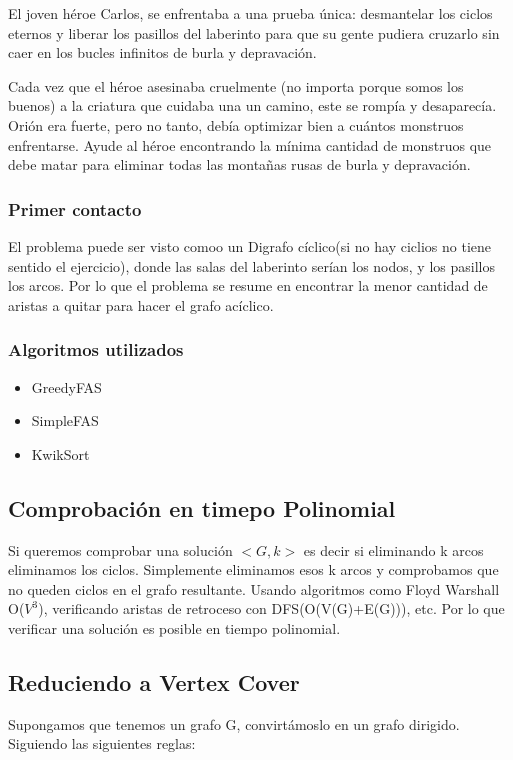 \documentclass{article}
\begin{document}
El joven héroe Carlos, se enfrentaba a una prueba única: desmantelar los ciclos eternos y liberar los pasillos del laberinto para que su gente pudiera cruzarlo sin caer en los bucles infinitos de burla y depravación.

Cada vez que el héroe asesinaba cruelmente (no importa porque somos los buenos) a la criatura que cuidaba una un camino, este se rompía y desaparecía. Orión era fuerte, pero no tanto, debía optimizar bien a cuántos monstruos enfrentarse. Ayude al héroe encontrando la mínima cantidad de monstruos que debe matar para eliminar todas las montañas rusas de burla y depravación.
	\subsubsection{Primer contacto}
El problema puede ser visto comoo un Digrafo cíclico(si no hay ciclios no tiene sentido el ejercicio), donde las salas del laberinto serían los nodos, y los pasillos los arcos. Por lo que el problema se resume en encontrar la menor cantidad de aristas a quitar para hacer el grafo acíclico.  
	\subsubsection{Algoritmos utilizados}
	\begin{itemize}
		\item GreedyFAS
		\item SimpleFAS
		\item KwikSort	
		
	\end{itemize}
\subsection{Comprobación en timepo Polinomial}
Si queremos comprobar una solución $<G, k>$ es decir si eliminando k arcos eliminamos los ciclos. Simplemente eliminamos esos k arcos y comprobamos que no queden ciclos en el grafo resultante. Usando algoritmos como Floyd Warshall O($V^3$), verificando aristas de retroceso con DFS(O(V(G)+E(G))), etc. Por lo que verificar una solución es posible en tiempo polinomial.

\subsection{Reduciendo a Vertex Cover}
Supongamos que tenemos un grafo G, convirtámoslo en un grafo dirigido.
Siguiendo las siguientes reglas:
\end{document}
